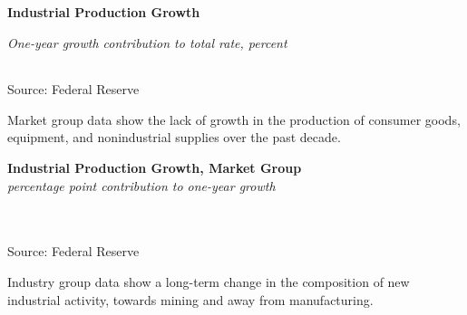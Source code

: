 \documentclass{report}
\makeatletter
\newcommand{\tbllink}[1]{\href{https://raw.githubusercontent.com/bdecon/US-chartbook/master/chartbook/data/#1}{\faTable}}
\newcommand*\short[1]{\expandafter\@gobbletwo\number\numexpr#1\relax}
\newcommand{\sbar}[4]{
		\addplot[ybar stacked, bar width=2.4pt, draw opacity=0, fill=#1] 
			table [x=#2, y=#3, col sep=comma]{#4};}
\newcommand{\dateaxisticks}{
		date coordinates in=x, axis line style={draw=none},
		xmax={2022-01-30},
		max space between ticks=40,	    
		xtick={{1990-01-01}, {1992-01-01}, {1994-01-01}, 
			{1996-01-01}, {1998-01-01}, {2000-01-01}, 
			{2002-01-01}, {2004-01-01}, {2006-01-01},
			{2008-01-01}, {2010-01-01}, {2012-01-01}, {2014-01-01},
		    {2016-01-01}, {2018-01-01}, {2020-01-01}, {2022-01-01}},
		minor xtick={{1989-01-01}, {1991-01-01}, {1993-01-01},
			{1995-01-01}, {1997-01-01}, {1999-01-01}, 
			{2001-01-01}, {2003-01-01}, {2005-01-01}, {2007-01-01},
		    {2009-01-01}, {2011-01-01}, {2013-01-01}, {2015-01-01},
		    {2017-01-01}, {2019-01-01}, {2021-01-01}},
		enlarge y limits={0.06}, enlarge x limits={0.01},
		}
\newcommand{\bbar}[2]{extra #1 ticks = {{#2}}, extra #1 tick labels = ,
		extra #1 tick style = {grid=major, grid style={thick, black!25}},}
\newcommand{\rbars}{
		\fill[color=black!10] (axis cs:{1990-07-01},\pgfkeysvalueof{/pgfplots/ymin}) rectangle 
			(axis cs:{1991-03-01}, \pgfkeysvalueof{/pgfplots/ymax});
		\fill[color=black!10] (axis cs:{2007-12-01},\pgfkeysvalueof{/pgfplots/ymin}) rectangle 
			(axis cs:{2009-07-01}, \pgfkeysvalueof{/pgfplots/ymax});
		\fill[color=black!10] (axis cs:{2001-03-01},\pgfkeysvalueof{/pgfplots/ymin}) rectangle 
			(axis cs:{2001-11-01}, \pgfkeysvalueof{/pgfplots/ymax});
		\fill[color=black!10] (axis cs:{2020-02-01},\pgfkeysvalueof{/pgfplots/ymin}) rectangle 
			(axis cs:{2020-05-01}, \pgfkeysvalueof{/pgfplots/ymax});}
\makeatother
\begin{document}
{\begin{minipage}{0.76\textwidth}
\normalsize \textbf{Industrial Production Growth}\\
\footnotesize{\textit{One-year growth \hspace{34mm} contribution to total \hspace{12mm} rate, percent}\\
\noindent {} \setlength{\tabcolsep}{3.1pt} \color{black!90}
		{\renewcommand{\arraystretch}{1.54}
		 \begin{tabular}{p{2mm} p{44mm} R{7.3mm} R{7.3mm} R{7.3mm} R{7.3mm} | R{8mm} R{7.3mm} 
		   R{7.3mm} R{7.3mm} }
			  \hline
		\end{tabular}}\vspace{-2mm}
		
\footnotesize{Source: Federal Reserve}}
\end{minipage}
\newpage
\begin{minipage}{0.76\textwidth}
\vspace{3mm}
\small Market group data show the lack of growth in the production of consumer goods, equipment, and nonindustrial supplies over the past decade.
\vspace{1mm}

\normalsize \textbf{Industrial Production Growth, Market Group}\\
\footnotesize{\textit{percentage point contribution to one-year growth}}\\\
\hspace*{-2mm} \\
\footnotesize{Source: Federal Reserve} \hfill \tbllink{indprogr.csv}
\vspace{3mm}

\small Industry group data show a long-term change in the composition of new industrial activity, towards mining and away from manufacturing.
\vspace{1mm}


\end{minipage}}
\end{document}
